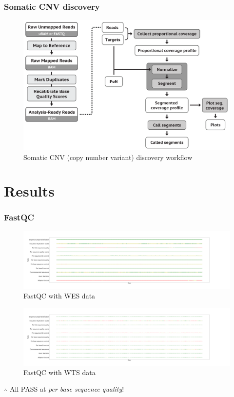 \documentclass{beamer}
\begin{document}
    \begin{frame}
        \frametitle{Somatic CNV discovery}

        \begin{figure}
            \includegraphics[width=0.7 \linewidth]{figures/Workflow/somatic_CNV.png}
            \caption{Somatic CNV (copy number variant) discovery workflow \protect\cite{gatk1, gatk2}}
        \end{figure}
    \end{frame}

    \section{Results}
    \begin{frame}
        \frametitle{FastQC}

        \begin{figure}
            \includegraphics[width=0.6 \linewidth]{figures/FastQC/FastQC_WES.png}
            \caption{FastQC with WES data}
        \end{figure}

        \begin{figure}
            \includegraphics[width=0.6 \linewidth]{figures/FastQC/FastQC_WTS.png}
            \caption{FastQC with WTS data}
        \end{figure}

        $\therefore$ All PASS at \textit{per base sequence quality}!
    \end{frame}
\end{document}
